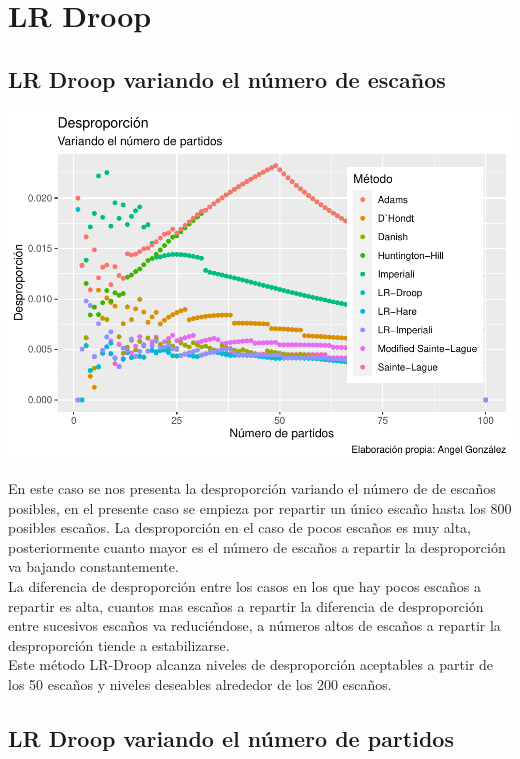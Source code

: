 \documentclass[12pt,a4paper,]{book}
\numberwithin{dummy}{section}
\theoremstyle{ocrenumbox}
\theoremstyle{blacknumex}
\theoremstyle{blacknumbox}
\theoremstyle{ocrenum}
\theoremstyle{ocrenum}
\begin{document}
\hypertarget{lr-droop}{%
\section{LR Droop}\label{lr-droop}}

\hypertarget{lr-droop-variando-el-nuxfamero-de-escauxf1os}{%
\subsection{LR Droop variando el número de
escaños}\label{lr-droop-variando-el-nuxfamero-de-escauxf1os}}

\begin{center}\includegraphics[width=0.95\linewidth]{figurasR/unnamed-chunk-56-1} \end{center}

En este caso se nos presenta la desproporción variando el número de de
escaños posibles, en el presente caso se empieza por repartir un único
escaño hasta los 800 posibles escaños. La desproporción en el caso de
pocos escaños es muy alta, posteriormente cuanto mayor es el número de
escaños a repartir la desproporción va bajando constantemente.\\
La diferencia de desproporción entre los casos en los que hay pocos
escaños a repartir es alta, cuantos mas escaños a repartir la diferencia
de desproporción entre sucesivos escaños va reduciéndose, a números
altos de escaños a repartir la desproporción tiende a estabilizarse.\\
Este método LR-Droop alcanza niveles de desproporción aceptables a
partir de los 50 escaños y niveles deseables alrededor de los 200
escaños.

\hypertarget{lr-droop-variando-el-nuxfamero-de-partidos}{%
\subsection{LR Droop variando el número de
partidos}\label{lr-droop-variando-el-nuxfamero-de-partidos}}
\end{document}

